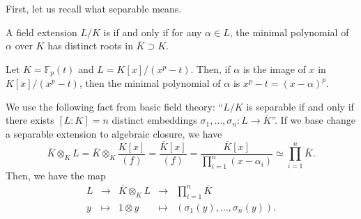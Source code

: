 First, let us recall what separable means.
\begin{definition}
    A field extension $L/K$ is  if and only if
    for any $\alpha\in L$, the minimal polynomial
    of $\alpha$ over $K$ has distinct roots in $\overline K\supset K$.
\end{definition}
\begin{example}
Let $K=\mathbb F_p(t)$ and $L=K[x]/(x^p-t)$.
Then, if $\alpha$ is the image of $x$ in $K[x]/(x^p-t)$,
then the minimal polynomial of $\alpha$ is $x^p-t = (x-\alpha)^p$.
\end{example}

We use the following fact from basic field theory:
``$L/K$ is separable
if and only if there exists $[L:K]=n$ distinct embeddings
$\sigma_1,\dots,\sigma_n : L\to\overline K$''.
If we base change a separable extension 
to algebraic closure, we have
$$\overline K \otimes_K L = \overline K\otimes_K \frac{K[x]}{(f)}
= \frac{\overline K[x]}{(f)}
= \frac{\overline K[x]}{\prod_{i=1}^n (x-\alpha_i)}
\simeq \prod_{i=1}^n \overline K.$$
Then, we have the map
\setlength\arraycolsep{2pt}
$$\begin{array}{rcccl}
    L &\to & \overline K\otimes_K L &\to & \prod_{i=1}^n\overline K \\[4pt]
    y &\mapsto & 1\otimes y &\mapsto & (\sigma_1(y),\dots,\sigma_n(y)).
\end{array}$$

